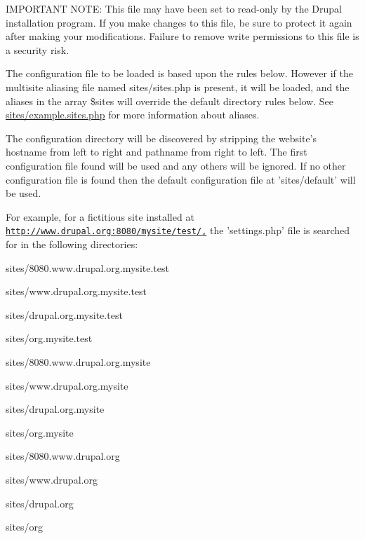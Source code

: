 IMPORTANT NOTE: This file may have been set to read-\/only by the Drupal installation program. If you make changes to this file, be sure to protect it again after making your modifications. Failure to remove write permissions to this file is a security risk.

The configuration file to be loaded is based upon the rules below. However if the multisite aliasing file named sites/sites.php is present, it will be loaded, and the aliases in the array \$sites will override the default directory rules below. See \hyperlink{example_8sites_8php}{sites/example.sites.php} for more information about aliases.

The configuration directory will be discovered by stripping the website's hostname from left to right and pathname from right to left. The first configuration file found will be used and any others will be ignored. If no other configuration file is found then the default configuration file at 'sites/default' will be used.

For example, for a fictitious site installed at \href{http://www.drupal.org:8080/mysite/test/,}{\tt http://www.drupal.org:8080/mysite/test/,} the 'settings.php' file is searched for in the following directories:


\begin{DoxyItemize}
\item sites/8080.www.drupal.org.mysite.test
\item sites/www.drupal.org.mysite.test
\item sites/drupal.org.mysite.test
\item sites/org.mysite.test
\end{DoxyItemize}


\begin{DoxyItemize}
\item sites/8080.www.drupal.org.mysite
\item sites/www.drupal.org.mysite
\item sites/drupal.org.mysite
\item sites/org.mysite
\end{DoxyItemize}


\begin{DoxyItemize}
\item sites/8080.www.drupal.org
\item sites/www.drupal.org
\item sites/drupal.org
\item sites/org
\end{DoxyItemize}


